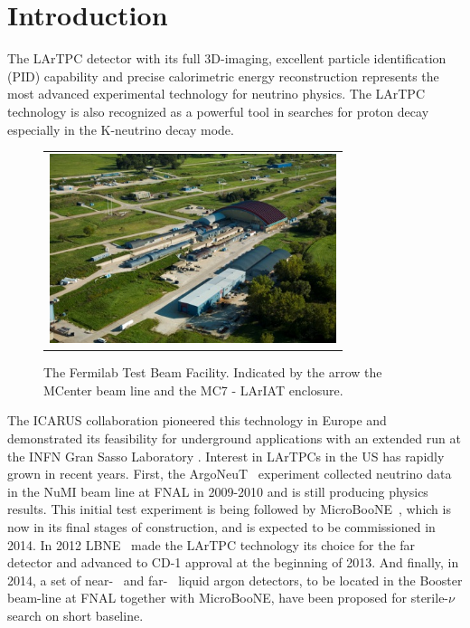 \documentclass[DIV=calc, paper=a4, fontsize=10pt, twocolumn]{scrartcl}	 %
\begin{document}
{\sf 
\section*{Introduction}

The LArTPC detector with its full 3D-imaging, excellent particle identification (PID) capability and precise calorimetric energy reconstruction represents the most advanced experimental technology for neutrino physics. The LArTPC technology is also recognized as a powerful tool in searches for proton decay especially in the K-neutrino decay mode. 

\begin{figure}[!h]
\begin{centering}
\begin{tabular}{c}
\includegraphics[width=3.3in]{Figures/MDB1.jpg}
\end{tabular}
\caption{
{\scriptsize \sf The Fermilab Test Beam Facility. Indicated by the arrow the MCenter beam line and the MC7 - LArIAT enclosure.}
}
\label{fig:ftbf}
\end{centering}
\end{figure}

The ICARUS collaboration pioneered this technology in Europe \cite{Icarus} and demonstrated its feasibility for underground applications with an extended run at the INFN Gran Sasso Laboratory \cite{Icarus_at_GS}.  Interest in LArTPCs in the US has rapidly grown in recent years. First, the ArgoNeuT~\cite{ArgoNeuT} experiment collected neutrino data in the NuMI beam line at FNAL in 2009-2010 and is still producing physics results. This initial test experiment is being followed by MicroBooNE~\cite{MicroBooNE}, which is now in its final stages of construction, and is expected to be commissioned in 2014.  In 2012 LBNE~\cite{LBNE} made the LArTPC technology its choice for the far detector and advanced to CD-1 approval at the beginning of 2013. And finally, in 2014, a set of  near- \cite{LAr1ND}~and far- \cite{ICA-FNAL} ~liquid argon detectors, to be located in the Booster beam-line at FNAL together with MicroBooNE, have been proposed for sterile-$\nu$ search on short baseline.

}
\end{document}
